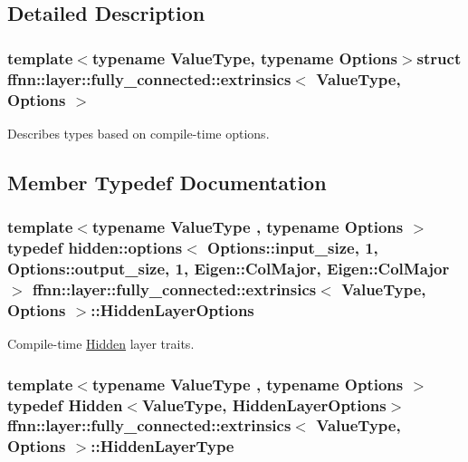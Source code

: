 \subsection{Detailed Description}
\subsubsection*{template$<$typename Value\-Type, typename Options$>$struct ffnn\-::layer\-::fully\-\_\-connected\-::extrinsics$<$ Value\-Type, Options $>$}

Describes types based on compile-\/time options. 

\subsection{Member Typedef Documentation}
\hypertarget{structffnn_1_1layer_1_1fully__connected_1_1extrinsics_a051d178770500c0f9775ab63d8a8f9fb}{
\subsubsection[{Hidden\-Layer\-Options}]{\setlength{\rightskip}{0pt plus 5cm}template$<$typename Value\-Type , typename Options $>$ typedef {\bf hidden\-::options}$<$ Options\-::input\-\_\-size, 1, Options\-::output\-\_\-size, 1, Eigen\-::\-Col\-Major, Eigen\-::\-Col\-Major $>$ {\bf ffnn\-::layer\-::fully\-\_\-connected\-::extrinsics}$<$ Value\-Type, Options $>$\-::{\bf Hidden\-Layer\-Options}}}\label{structffnn_1_1layer_1_1fully__connected_1_1extrinsics_a051d178770500c0f9775ab63d8a8f9fb}


Compile-\/time \hyperlink{classffnn_1_1layer_1_1_hidden}{Hidden} layer traits. 

\hypertarget{structffnn_1_1layer_1_1fully__connected_1_1extrinsics_aafc02edf8e6c520eae8e44f92abb1925}{
\subsubsection[{Hidden\-Layer\-Type}]{\setlength{\rightskip}{0pt plus 5cm}template$<$typename Value\-Type , typename Options $>$ typedef {\bf Hidden}$<$Value\-Type, {\bf Hidden\-Layer\-Options}$>$ {\bf ffnn\-::layer\-::fully\-\_\-connected\-::extrinsics}$<$ Value\-Type, Options $>$\-::{\bf Hidden\-Layer\-Type}}}\label{structffnn_1_1layer_1_1fully__connected_1_1extrinsics_aafc02edf8e6c520eae8e44f92abb1925}


